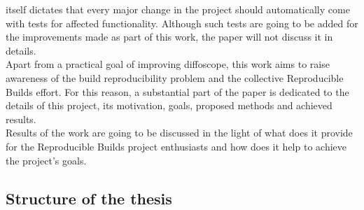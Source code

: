 {itself dictates that every major change in the project should automatically come
with tests for affected functionality. Although such tests are going to be added
for the improvements made as part of this work, the paper will not discuss it in
details.\\
Apart from a practical goal of improving diffoscope, this work aims
to raise awareness of the build reproducibility problem and the collective
Reproducible Builds effort. For this reason, a substantial part of
the paper is dedicated to the details of this project, its motivation, goals,
proposed methods and achieved results.\\
Results of the work are going to be discussed in the light of what does it
provide for the Reproducible Builds project enthusiasts and how does
it help to achieve the project's goals.
}

\subsection[Structure of the thesis]{Structure of the thesis}



